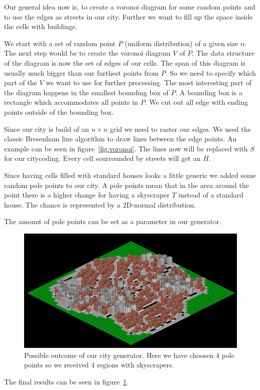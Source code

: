 \documentclass{scrartcl}
\begin{document}
Our general idea now is,  to create a voronoi diagram for some random points
and to use the edges as streets in our city. Further we want to fill up the
space inside the cells with buildings. 

We  start with a set of random point $P$ (uniform distribution) of a given
size $n$. The next step would be to create the voronoi diagram $V$ of $P$.
The data structure of the diagram is now the set of edges of our cells.
The span of this diagram is usually much bigger than our furthest points from $P$.
So we need to specify which part of the $V$ we want to use for further processing.
The most interesting part of the diagram happens in the smallest bounding
box of $P$. A bounding box is a rectangle which
accommodates all points in $P$. We cut out all edge with ending points outside
of the bounding box.

Since our city is build of an $n\times n$ grid we need to raster our edges.
We used the classic Bresenham line algorithm to draw lines between the edge points.
An example can be seen in figure~\ref{fig:voronoi}.
The lines now will be replaced with $S$ for our citycoding. Every cell sourrounded
by streets will get an $H$.

Since having cells filled with standard houses looks a little
generic we added some random pole points to our city.
A pole points mean that in the area around the point there is a higher change
for having a skyscraper $T$ instead of a standard house. The chance is represented
by a 2D-normal distribution.

The amount of pole points can be set as a parameter in our generator.

\begin{figure}
    \centering
    \includegraphics[scale = 1.2]{city1}
    \caption{Possible outcome of our city generator. Here we have choosen 4 pole
    points so we received 4 regions with skyscrapers.}
    \label{fig:city_example}
\end{figure}

The final results can be seen in figure~\ref{fig:city_example}.
\end{document}
